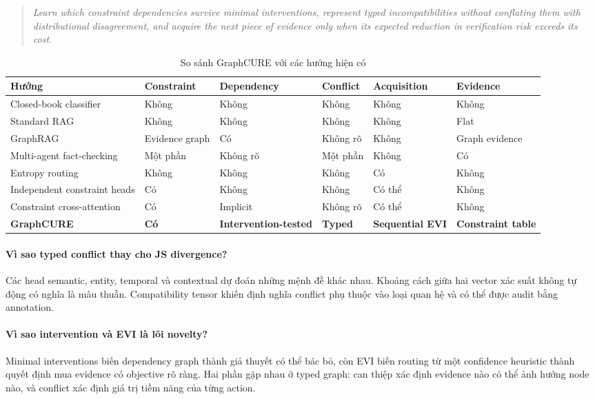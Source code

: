 \documentclass[11pt,a4paper]{article}
\begin{document}
\begin{quote}
\textit{Learn which constraint dependencies survive minimal interventions, represent typed incompatibilities without conflating them with distributional disagreement, and acquire the next piece of evidence only when its expected reduction in verification risk exceeds its cost.}
\end{quote}

\begin{table}[H]
\centering
\small
\caption{So sánh GraphCURE với các hướng hiện có}
\begin{tabularx}{\linewidth}{lXXXXX}
\toprule
\textbf{Hướng}
& \textbf{Constraint}
& \textbf{Dependency}
& \textbf{Conflict}
& \textbf{Acquisition}
& \textbf{Evidence}\\
\midrule
Closed-book classifier
& Không & Không & Không & Không & Không\\
Standard RAG
& Không & Không & Không & Không & Flat\\
GraphRAG
& Evidence graph & Có & Không rõ & Không & Graph evidence\\
Multi-agent fact-checking
& Một phần & Không rõ & Một phần & Không & Có\\
Entropy routing
& Không & Không & Không & Có & Không\\
Independent constraint heads
& Có & Không & Không & Có thể & Không\\
Constraint cross-attention
& Có & Implicit & Không rõ & Có thể & Không\\
\textbf{GraphCURE}
& \textbf{Có}
& \textbf{Intervention-tested}
& \textbf{Typed}
& \textbf{Sequential EVI}
& \textbf{Constraint table}\\
\bottomrule
\end{tabularx}
\end{table}

\paragraph{Vì sao typed conflict thay cho JS divergence?}
Các head semantic, entity, temporal và contextual dự đoán những mệnh đề khác nhau. Khoảng cách giữa hai vector xác suất không tự động có nghĩa là mâu thuẫn. Compatibility tensor khiến định nghĩa conflict phụ thuộc vào loại quan hệ và có thể được audit bằng annotation.

\paragraph{Vì sao intervention và EVI là lõi novelty?}
Minimal interventions biến dependency graph thành giả thuyết có thể bác bỏ, còn EVI biến routing từ một confidence heuristic thành quyết định mua evidence có objective rõ ràng. Hai phần gặp nhau ở typed graph: can thiệp xác định evidence nào có thể ảnh hưởng node nào, và conflict xác định giá trị tiềm năng của từng action.
\end{document}

